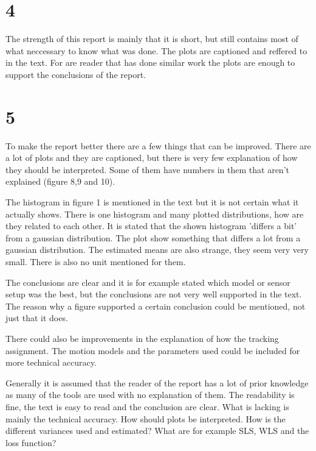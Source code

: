 \documentclass[10pt,a4paper]{report}
\begin{document}
\section*{4}
The strength of this report is mainly that it is short, but still contains most of what neccessary to know what was done.
The plots are captioned and reffered to in the text.
For are reader that has done similar work the plots are enough to support the conclusions of the report.

\section*{5}
To make the report better there are a few things that can be improved.
There are a lot of plots and they are captioned, but there is very few explanation of how they should be interpreted.
Some of them have numbers in them that aren't explained (figure 8,9 and 10).

The histogram in figure 1 is mentioned in the text but it is not certain what it actually shows.
There is one histogram and many plotted distributions, how are they related to each other.
It is stated that the shown histogram 'differs a bit' from a gaussian distribution.
The plot show something that differs a lot from a gaussian distribution.
The estimated means are also strange, they seem very very small.
There is also no unit mentioned for them.

The conclusions are clear and it is for example stated which model or sensor setup was the best, but the conclusions are not very well supported in the text.
The reason why a figure supported a certain conclusion could be mentioned, not just that it does.

There could also be improvements in the explanation of how the tracking assignment.
The motion models and the parameters used could be included for more technical accuracy.

Generally it is assumed that the reader of the report has a lot of prior knowledge as many of the tools are used with no explanation of them.
The readability is fine, the text is easy to read and the conclusion are clear.
What is lacking is mainly the technical accuracy.
How should plots be interpreted.
How is the different variances used and estimated?
What are for example SLS, WLS and the loss function?
\end{document}

